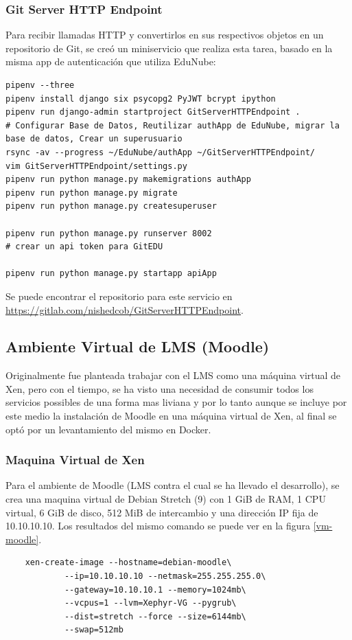 \subsubsection{Git Server HTTP Endpoint}
Para recibir llamadas HTTP y convertirlos en sus respectivos objetos en un repositorio de Git, se creó un miniservicio que realiza esta tarea, basado en la misma app de autenticación que utiliza EduNube:
\begin{lstlisting}
pipenv --three
pipenv install django six psycopg2 PyJWT bcrypt ipython
pipenv run django-admin startproject GitServerHTTPEndpoint .
# Configurar Base de Datos, Reutilizar authApp de EduNube, migrar la base de datos, Crear un superusuario
rsync -av --progress ~/EduNube/authApp ~/GitServerHTTPEndpoint/
vim GitServerHTTPEndpoint/settings.py
pipenv run python manage.py makemigrations authApp
pipenv run python manage.py migrate
pipenv run python manage.py createsuperuser

pipenv run python manage.py runserver 8002
# crear un api token para GitEDU

pipenv run python manage.py startapp apiApp
\end{lstlisting}

Se puede encontrar el repositorio para este servicio en \url{https://gitlab.com/nishedcob/GitServerHTTPEndpoint}.

 
\subsection{Ambiente Virtual de LMS  (Moodle)}
\label{instalacion-moodle}
Originalmente fue planteada trabajar con el LMS como una máquina virtual de Xen, pero con el tiempo, se ha visto una necesidad de consumir todos los servicios possibles de una forma mas liviana y por lo tanto aunque se incluye por este medio la instalación de Moodle en una máquina virtual de Xen, al final se optó por un levantamiento del mismo en Docker.

\subsubsection{Maquina Virtual de Xen}
Para el ambiente de Moodle (LMS  contra el cual se ha llevado el desarrollo), se crea una maquina virtual de Debian Stretch (9) con 1 GiB de RAM, 1 CPU virtual, 6 GiB de disco, 512 MiB de intercambio y una dirección IP fija de 10.10.10.10. Los resultados del mismo comando se puede ver en la figura \ref{vm-moodle}.
\begin{lstlisting}
	xen-create-image --hostname=debian-moodle\
    		--ip=10.10.10.10 --netmask=255.255.255.0\
        	--gateway=10.10.10.1 --memory=1024mb\
        	--vcpus=1 --lvm=Xephyr-VG --pygrub\
        	--dist=stretch --force --size=6144mb\
        	--swap=512mb
\end{lstlisting}

